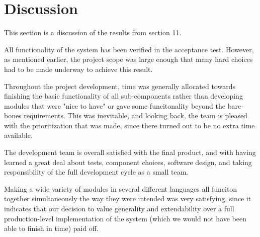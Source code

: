 \chapter{Discussion}
This section is a discussion of the results from section 11. 

All functionality of the system has been verified in the acceptance test. However, as mentioned earlier, the project scope was large enough that many hard choices had to be made underway to achieve this result.

Throughout the project development, time was generally allocated towards finishing the basic functionality of all sub-components rather than developing modules that were "nice to have" or gave some funcitonality beyond the bare-bones requirements. This was inevitable, and looking back, the team is pleased with the prioritization that was made, since there turned out to be no extra time available.

The development team is overall satisfied with the final product, and with having learned a great deal about tests, component choices, software design, and taking responsibility of the full development cycle as a small team. 

Making a wide variety of modules in several different languages all funciton together simultaneously the way they were intended was very satisfying, since it indicates that our decision to value generality and extendability over a full production-level implementation of the system (which we would not have been able to finish in time) paid off.